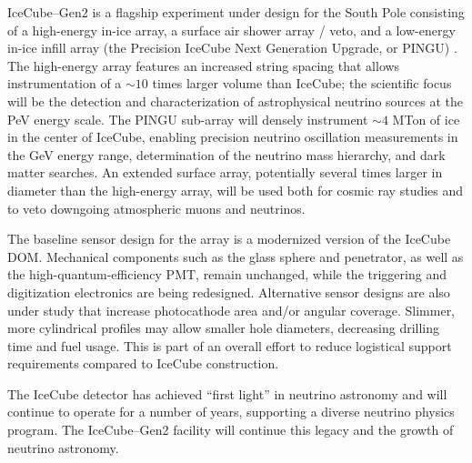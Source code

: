 IceCube--Gen2 is a flagship experiment under design for the South Pole
consisting of a high-energy in-ice array, a surface air shower array /
veto, and a low-energy in-ice infill array (the Precision IceCube Next
Generation Upgrade, or PINGU) \cite{gen2_whitepaper}.  The high-energy
array features an increased string spacing that allows instrumentation of a
$\sim10$ times larger volume than IceCube; the scientific focus will be the
detection and characterization of astrophysical neutrino sources at the PeV
energy scale.  The PINGU sub-array \cite{pingu_loi} will densely instrument
$\sim4$ MTon of ice in the center of IceCube, enabling precision neutrino
oscillation measurements in the GeV energy range, determination of the
neutrino mass hierarchy, and dark matter searches.  An extended surface
array, potentially several times larger in diameter than the high-energy
array, will be used both for cosmic ray studies and to veto downgoing
atmospheric muons and neutrinos.

The baseline sensor design for the array is a modernized version of the
IceCube DOM.  Mechanical components such as the glass sphere and
penetrator, as well as the high-quantum-efficiency PMT, remain unchanged,
while the triggering and digitization electronics are being redesigned.
Alternative sensor designs are also under study that increase photocathode
area and/or angular coverage.  Slimmer, more cylindrical profiles may
allow smaller hole diameters, decreasing drilling time and fuel usage.  This
is part of an overall effort to reduce logistical support requirements
compared to IceCube construction.  

The IceCube detector has achieved ``first light'' in neutrino astronomy and
will continue to operate for a number of years, supporting a diverse
neutrino physics program.  The IceCube--Gen2 facility will continue this
legacy and the growth of neutrino astronomy.

